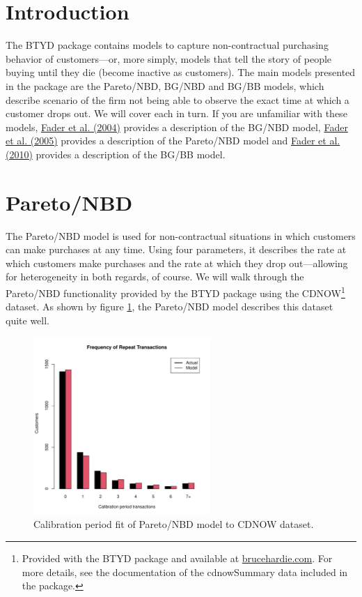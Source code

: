 \documentclass[10pt, letterpaper, onecolumn, oneside, final]{article}\usepackage[]{graphicx}\usepackage[]{color}
\begin{document}
\section{Introduction}

The BTYD package contains models to capture non-contractual purchasing
behavior of customers---or, more simply, models that tell the story of
people buying until they die (become inactive as customers). The main
models presented in the package are the Pareto/NBD, BG/NBD and BG/BB
models, which describe scenario of the firm not being able to observe
the exact time at which a customer drops out. We will cover
each in turn. If you are unfamiliar with these models,
\href{http://brucehardie.com/papers/018/fader_et_al_mksc_05.pdf}{Fader et al. (2004)} provides a description of the BG/NBD model,
\href{http://www.brucehardie.com/notes/008/pareto_nbd_MATLAB.pdf}{Fader et al. (2005)} provides a description of the Pareto/NBD model and
\href{http://www.brucehardie.com/papers/020/}{Fader et al. (2010)} provides a description of the BG/BB model.

\section{Pareto/NBD}

The Pareto/NBD model is used for non-contractual situations in which
customers can make purchases at any time. Using four parameters, it
describes the rate at which customers make purchases and the rate at
which they drop out---allowing for heterogeneity in both
regards, of course. We will walk through the Pareto/NBD functionality
provided by the BTYD package using the CDNOW\footnote{Provided with
  the BTYD package and available at
  \href{http://www.brucehardie.com}{brucehardie.com}. For more
  details, see the documentation of the cdnowSummary data included in
  the package.} dataset. As shown by
figure \ref{fig:pnbdCalibrationFit}, the Pareto/NBD model describes
this dataset quite well.



\begin{figure}
  \begin{center}
  \includegraphics[width=0.6\textwidth]{figure/pnbdCalibrationFit}
  \caption{Calibration period fit of Pareto/NBD model to CDNOW dataset.}\label{fig:pnbdCalibrationFit}
  \end{center}
\end{figure}
\end{document}
